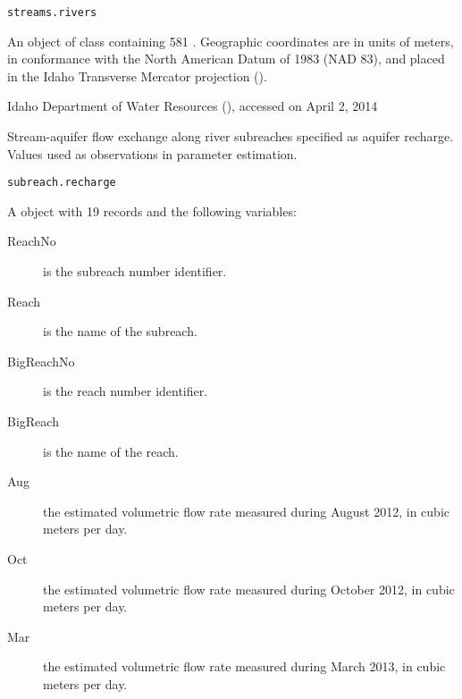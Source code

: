 \documentclass[a4paper]{book}
\begin{document}
%
\begin{Usage}
\begin{verbatim}
streams.rivers
\end{verbatim}
\end{Usage}
%
\begin{Format}
An object of  class containing 581 .
Geographic coordinates are in units of meters, in conformance with the North American Datum of 1983 (NAD 83), and placed in the
Idaho Transverse Mercator projection ().
\end{Format}
%
\begin{Source}\relax
Idaho Department of Water Resources (), accessed on April 2, 2014
\end{Source}
%
\begin{Examples}
\end{Examples}
%
\begin{Description}\relax
Stream-aquifer flow exchange along river subreaches specified as aquifer recharge.
Values used as observations in parameter estimation.
\end{Description}
%
\begin{Usage}
\begin{verbatim}
subreach.recharge
\end{verbatim}
\end{Usage}
%
\begin{Format}
A  object with 19 records and the following variables:
\begin{description}

\item[ReachNo] is the subreach number identifier.
\item[Reach] is the name of the subreach.
\item[BigReachNo] is the reach number identifier.
\item[BigReach] is the name of the reach.
\item[Aug] the estimated volumetric flow rate measured during August 2012, in cubic meters per day.
\item[Oct] the estimated volumetric flow rate measured during October 2012, in cubic meters per day.
\item[Mar] the estimated volumetric flow rate measured during March 2013, in cubic meters per day.

\end{description}

\end{Format}
\end{document}
